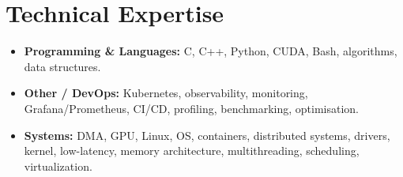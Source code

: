 \documentclass[9pt,a4paper]{article}
\begin{document}
\section*{Technical Expertise}
\begin{tcolorbox}[mybox]
\begin{itemize}
\item \textbf{Programming \& Languages:} C, C++, Python, CUDA, Bash, algorithms, data structures.

\item \textbf{Other / DevOps:} Kubernetes, observability, monitoring, Grafana/Prometheus, CI/CD, profiling, benchmarking, optimisation.

\item \textbf{Systems:} DMA, GPU, Linux, OS, containers, distributed systems, drivers, kernel, low-latency, memory architecture, multithreading, scheduling, virtualization.
\end{itemize}
\end{tcolorbox}
\end{document}
